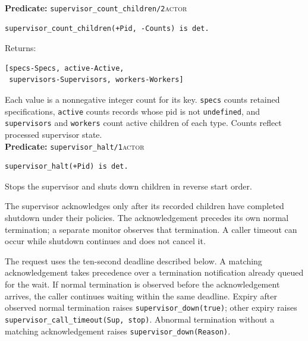 \noindent \textbf{Predicate:} \texttt{supervisor\_\allowbreak{}count\_\allowbreak{}children/\allowbreak{}2}\hfill\textsc{actor}

\begin{verbatim}
supervisor_count_children(+Pid, -Counts) is det.
\end{verbatim}

\noindent Returns:

\begin{verbatim}
[specs-Specs, active-Active,
 supervisors-Supervisors, workers-Workers]
\end{verbatim}

\noindent Each value is a nonnegative integer count for its key. \texttt{specs} counts
retained specifications, \texttt{active} counts records whose pid is not
\texttt{undefined}, and \texttt{supervisors} and \texttt{workers} count active
children of each type. Counts reflect processed supervisor state.\\


\noindent \textbf{Predicate:} \texttt{supervisor\_\allowbreak{}halt/\allowbreak{}1}\hfill\textsc{actor}

\begin{verbatim}
supervisor_halt(+Pid) is det.
\end{verbatim}

Stops the supervisor and shuts down children in reverse start order.

The supervisor acknowledges only after its recorded children have completed
shutdown under their policies. The acknowledgement precedes its own normal
termination; a separate monitor observes that termination. A caller timeout
can occur while shutdown continues and does not cancel it.

The request uses the ten-second deadline described below. A matching
acknowledgement takes precedence over a termination notification already
queued for the wait. If normal termination is observed before the
acknowledgement arrives, the caller continues waiting within the same deadline.
Expiry after observed normal termination raises
\texttt{supervisor\_\allowbreak{}down(\allowbreak{}true)}; other expiry raises
\texttt{supervisor\_\allowbreak{}call\_\allowbreak{}timeout(\allowbreak{}Sup,\allowbreak{} stop)}. Abnormal termination without
a matching acknowledgement raises \texttt{supervisor\_\allowbreak{}down(\allowbreak{}Reason)}.

